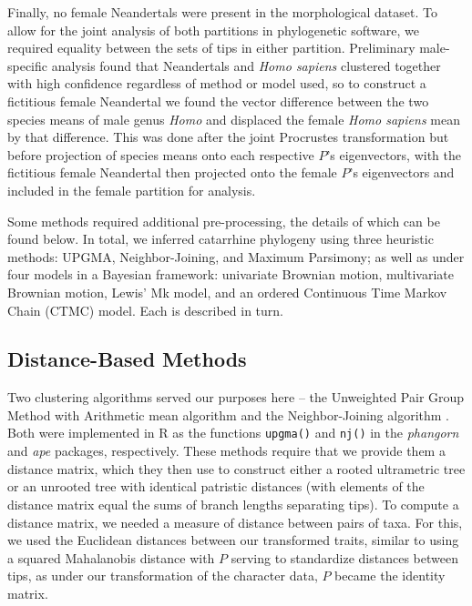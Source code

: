 \documentclass[10pt, twocolumn, twoside]{article}
\begin{document}
Finally, no female Neandertals were present in the morphological dataset. To allow for the joint analysis of both partitions in phylogenetic software, we required equality between the sets of tips in either partition. Preliminary male-specific analysis found that Neandertals and \textit{Homo sapiens} clustered together with high confidence regardless of method or model used, so to construct a fictitious female Neandertal we found the vector difference between the two species means of male genus \textit{Homo} and displaced the female \textit{Homo sapiens} mean by that difference. This was done after the joint Procrustes transformation but before projection of species means onto each respective $P$'s eigenvectors, with the fictitious female Neandertal then projected onto the female $P$'s eigenvectors and included in the female partition for analysis.

Some methods required additional pre-processing, the details of which can be found below. In total, we inferred catarrhine phylogeny using three heuristic methods: UPGMA, Neighbor-Joining, and Maximum Parsimony; as well as under four models in a Bayesian framework: univariate Brownian motion, multivariate Brownian motion, Lewis' Mk model, and an ordered Continuous Time Markov Chain (CTMC) model. Each is described in turn. 

\subsection{Distance-Based Methods}

Two clustering algorithms served our purposes here -- the Unweighted Pair Group Method with Arithmetic mean algorithm \citep{sokalStatisticalMethodEvaluating1958} and the Neighbor-Joining algorithm \citep{saitouNeighborjoiningMethodNew1987}. Both were implemented in R as the functions \texttt{upgma()} and \texttt{nj()} in the \textit{phangorn} \citep{schliepPhangornPhylogeneticAnalysis2011} and \textit{ape} \citep{paradisAPEAnalysesPhylogenetics2004} packages, respectively. These methods require that we provide them a distance matrix, which they then use to construct either a rooted ultrametric tree or an unrooted tree with identical patristic distances (with elements of the distance matrix equal the sums of branch lengths separating tips). To compute a distance matrix, we needed a measure of distance between pairs of taxa. For this, we used the Euclidean distances between our transformed traits, similar to using a squared Mahalanobis distance \citep{mahalanobisGeneralizedDistanceStatistics1936} with $P$ serving to standardize distances between tips, as under our transformation of the character data, $P$ became the identity matrix. 
\end{document}
